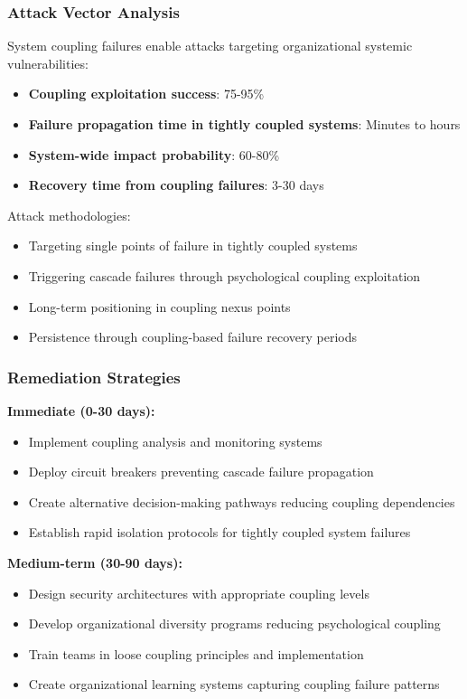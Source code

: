 \documentclass[11pt,a4paper]{article}
\begin{document}
\subsubsection{Attack Vector Analysis}

System coupling failures enable attacks targeting organizational systemic vulnerabilities:

\begin{itemize}
\item \textbf{Coupling exploitation success}: 75-95\%
\item \textbf{Failure propagation time in tightly coupled systems}: Minutes to hours
\item \textbf{System-wide impact probability}: 60-80\%
\item \textbf{Recovery time from coupling failures}: 3-30 days
\end{itemize}

Attack methodologies:
\begin{itemize}
\item Targeting single points of failure in tightly coupled systems
\item Triggering cascade failures through psychological coupling exploitation
\item Long-term positioning in coupling nexus points
\item Persistence through coupling-based failure recovery periods
\end{itemize}

\subsubsection{Remediation Strategies}

\textbf{Immediate (0-30 days):}
\begin{itemize}
\item Implement coupling analysis and monitoring systems
\item Deploy circuit breakers preventing cascade failure propagation
\item Create alternative decision-making pathways reducing coupling dependencies
\item Establish rapid isolation protocols for tightly coupled system failures
\end{itemize}

\textbf{Medium-term (30-90 days):}
\begin{itemize}
\item Design security architectures with appropriate coupling levels
\item Develop organizational diversity programs reducing psychological coupling
\item Train teams in loose coupling principles and implementation
\item Create organizational learning systems capturing coupling failure patterns
\end{itemize}
\end{document}
